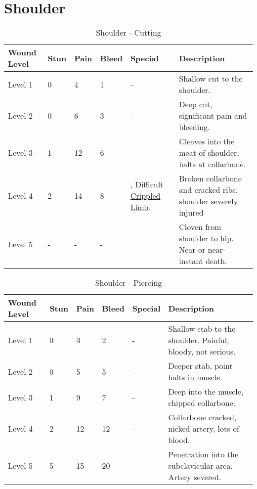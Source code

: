 \documentclass[oneside,11pt,english]{book}
\begin{document}
\section{Shoulder} \vspace{-25pt} \label{sec:shoulder}
\begin{table}[hb] %
	\caption{Shoulder - Cutting}
	\label{wound:Shoulder - Cutting}
	\begin{tabu} to 
Wound Level &Stun &Pain &Bleed &Special &Description\\\toprule
Level 1& 0& 4& 1& - &Shallow cut to the shoulder.\\
Level 2& 0& 6& 3& - &Deep cut, significant pain and bleeding.\\
Level 3& 1& 12& 6&  &Cleaves into the meat of shoulder, halts at collarbone.\\
Level 4& 2& 14& 8
	&, \newline
		Difficult~ \hyperref[bane:Crippled Limb/Appendage]{Crippled Limb}.
	&Broken collarbone and cracked ribs, shoulder severely injured\\
Level 5& - &- &- && Cloven from shoulder to hip. Near or near-instant death.\\
	\end{tabu}
\end{table}
\begin{table}[hb] %
	\caption{Shoulder - Piercing}
	\label{wound:Shoulder - Piercing}
	\begin{tabu} to 
Wound Level &Stun &Pain &Bleed &Special &Description\\\toprule
Level 1& 0& 3& 2& - &Shallow stab to the shoulder. Painful, bloody, not serious.\\
Level 2& 0& 5& 5& - &Deeper stab, point halts in muscle.\\
Level 3& 1& 9& 7& - &Deep into the muscle, chipped collarbone.\\
Level 4& 2& 12& 12& - &Collarbone cracked, nicked artery, lots of blood.\\
Level 5& 5& 15& 20& - &Penetration into the subclavicular area. Artery severed.\\
	\end{tabu}
\end{table}
\end{document}
